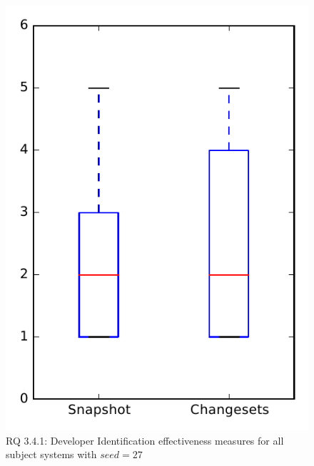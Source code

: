 
\begin{figure}
\centering
\includegraphics[height=0.4\textheight]{figures/dit_seed/rq1_overview_27}
\caption{RQ 3.4.1: Developer Identification effectiveness measures for all subject systems with $seed=27$}
\label{fig:dit_seed:rq1:overview}
\end{figure}
